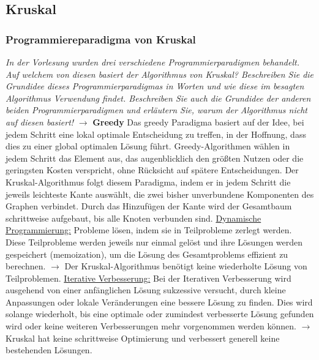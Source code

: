 \documentclass{article}
\begin{document}
  \newpage
\subsection{Kruskal}
\subsubsection{Programmiereparadigma von Kruskal}
\textit{In der Vorlesung wurden drei verschiedene Programmierparadigmen  behandelt. Auf welchem von diesen basiert der Algorithmus von Kruskal? Beschreiben Sie die Grundidee dieses Programmierparadigmas in Worten und wie diese im besagten Algorithmus Verwendung findet. Beschreiben Sie auch die Grundidee der anderen beiden Programmierparadigmen und erläutern Sie, warum der Algorithmus nicht auf diesen basiert! } \cite{hauptklausur21}
\newline \newline
$\rightarrow$ \textbf{Greedy} \newline {} 
Das greedy Paradigma basiert auf der Idee, bei jedem Schritt eine lokal optimale Entscheidung zu treffen, in der Hoffnung, dass dies zu einer global optimalen Lösung führt. Greedy-Algorithmen wählen in jedem Schritt das Element aus, das augenblicklich den größten Nutzen oder die geringsten Kosten verspricht, ohne Rücksicht auf spätere Entscheidungen. \newline
Der Kruskal-Algorithmus folgt diesem Paradigma, indem er in jedem Schritt die jeweils leichteste Kante auswählt, die zwei bisher unverbundene Komponenten des Graphen verbindet. Durch das Hinzufügen der Kante wird der Gesamtbaum schrittweise aufgebaut, bis alle Knoten verbunden sind. \newline \newline
\underline{Dynamische Programmierung:} \newline {} 
Probleme lösen, indem sie in Teilprobleme zerlegt werden. Diese Teilprobleme werden jeweils nur einmal gelöst und ihre Lösungen werden gespeichert (memoization), um die Lösung des Gesamtproblems effizient zu berechnen. \newline
$\rightarrow$ Der Kruskal-Algorithmus benötigt keine wiederholte Lösung von Teilproblemen. 
\newline \newline
\underline{Iterative Verbesserung:} \newline {}
Bei der Iterativen Verbesserung wird ausgehend von einer anfänglichen Lösung sukzessive versucht, durch kleine Anpassungen oder lokale Veränderungen eine bessere Lösung zu finden. Dies wird solange wiederholt, bis eine optimale oder zumindest verbesserte Lösung gefunden wird oder keine weiteren Verbesserungen mehr vorgenommen werden können. \newline
$\rightarrow$ Kruskal hat keine schrittweise Optimierung und verbessert generell keine bestehenden Lösungen. 
\end{document}
